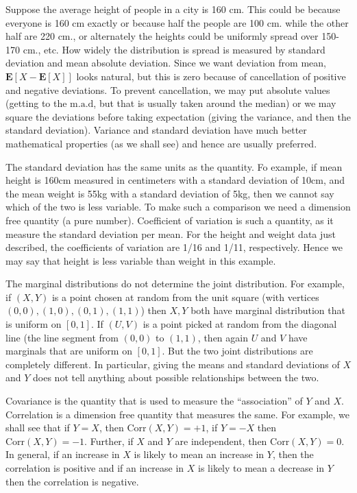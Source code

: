 \documentclass[preprint,  11pt]{amsart}
\newcommand{\para}[1]{\vspace{4mm}\noindent{\bfseries #1:}}
\theoremstyle{plain} %
\theoremstyle{definition} %
\begin{document}
\para{Measures of dispersion} Suppose the average height of people in a city is 160 cm. This could be because everyone is 160 cm exactly or because half the people are 100 cm. while the other half are 220 cm., or alternately the heights could be uniformly spread over 150-170 cm., etc. How widely the distribution is  spread is measured by standard deviation and mean absolute deviation. Since we want deviation from mean, $\mathbf{E}[X-\mathbf{E}[X]]$ looks natural, but this is zero because of cancellation of positive and negative deviations. To prevent cancellation, we may put absolute values (getting to the $\mbox{m.a.d}$, but that is usually taken around the median) or we may square the deviations before taking expectation (giving the variance, and then the standard deviation). Variance and standard deviation have much better mathematical properties (as we shall see) and hence are usually preferred.

The standard deviation has the same units as the quantity. Fo example, if mean height is 160cm  measured in centimeters with a standard deviation of 10cm, and the mean weight is 55kg with a  standard deviation of 5kg, then we cannot say which of the two is less variable. To make such a comparison we need a dimension free quantity (a pure number). Coefficient of variation is such a quantity, as it measure the standard deviation per mean. For the height and weight data just described, the coefficients of variation are 1/16 and 1/11, respectively. Hence we may say that height is less variable than weight in this example. 


\para{Measures of association} The marginal distributions do not determine the joint distribution. For example, if $(X,Y)$ is a point chosen at random from the unit square (with vertices $(0,0),(1,0),(0,1),(1,1)$) then $X,Y$ both have marginal distribution that is uniform on $[0,1]$. If $(U,V)$ is a point picked at random from the diagonal line (the line segment from $(0,0)$ to $(1,1)$, then again $U$ and $V$ have marginals that are uniform on $[0,1]$. 
But the two joint distributions are completely different. In particular, giving the means and standard deviations of $X$ and $Y$ does not tell anything about possible relationships between the two. 

Covariance is the quantity that is used to measure the ``association'' of $Y$ and $X$. Correlation is a dimension free quantity that measures the same. For example, we shall see that if $Y=X$, then $\mbox{Corr}(X,Y)=+1$, if $Y=-X$ then $\mbox{Corr}(X,Y)=-1$. Further, if $X$ and $Y$ are independent, then $\mbox{Corr}(X,Y)=0$. In general, if an increase in $X$ is likely to mean an increase in $Y$, then the correlation is positive and if an increase in $X$ is likely to mean a decrease in $Y$ then the correlation is negative.
\end{document}
